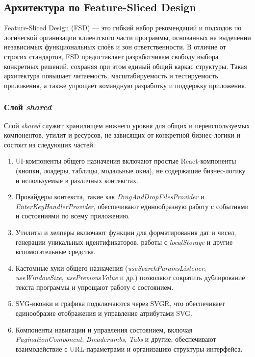 \subsection{Архитектура по Feature-Sliced Design}

Feature-Sliced Design (FSD) — это гибкий набор рекомендаций и подходов по логической организации клиентского части программы, основанных на выделении независимых функциональных слоёв и зон ответственности. В отличие от строгих стандартов, FSD предоставляет разработчикам свободу выбора конкретных решений, сохраняя при этом единый общий каркас структуры. Такая архитектура повышает читаемость, масштабируемость и тестируемость приложения, а также упрощает командную разработку и поддержку приложения.

\subsubsection{Слой \textit{shared}}

Слой \textit{shared} служит хранилищем нижнего уровня для общих и переиспользуемых компонентов, утилит и ресурсов, не зависящих от конкретной бизнес-логики и состоит из следующих частей:

\begin{enumerate}
  \item UI-компоненты общего назначения включают простые React-компоненты (кнопки, лоадеры, таблицы, модальные окна), не содержащие бизнес-логику и используемые в различных контекстах.
  \item Провайдеры контекста, такие как \textit{DragAndDropFilesProvider} и \textit{EnterKeyHandlerProvider}, обеспечивают единообразную работу с событиями и состояниями по всему приложению.
  \item Утилиты и хелперы включают функции для форматирования дат и чисел, генерации уникальных идентификаторов, работы с \textit{localStorage} и другие вспомогательные средства.
  \item Кастомные хуки общего назначения (\textit{useSearchParamsListener}, \textit{useWindowSize}, \textit{usePreviousValue} и др.) позволяют сократить дублирование текста программы и упрощают работу с состоянием.
  \item SVG-иконки и графика подключаются через SVGR, что обеспечивает единообразие отображения и управление атрибутами SVG.
  \item Компоненты навигации и управления состоянием, включая \textit{PaginationComponent}, \textit{Breadcrumbs}, \textit{Tabs} и другие, обеспечивают взаимодействие с URL-параметрами и организацию структуры интерфейса.
\end{enumerate}
